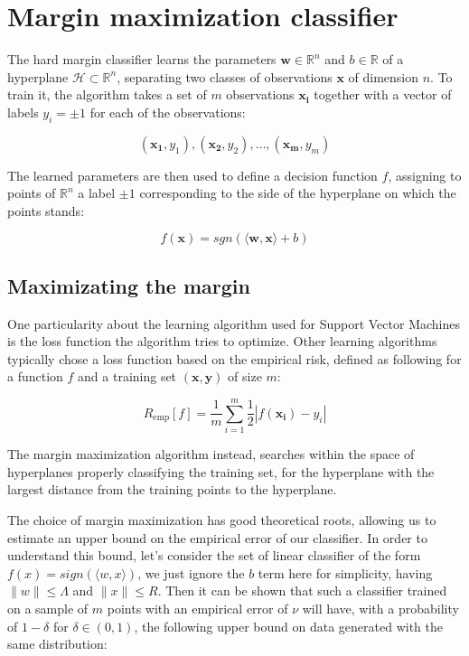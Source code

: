 
\section {Margin maximization classifier}

The hard margin classifier learns the parameters $\mathbf{w} \in \mathbb{R}^n$ and $b \in \mathbb{R}$ of a hyperplane $\mathscr{H} \subset \mathbb{R}^n$, separating two classes of observations $\mathbf{x}$ of dimension $n$. To train it, the algorithm takes a set of $m$ observations $\mathbf{x_i}$ together with a vector of labels $y_i = \pm 1$ for each of the observations:

$$
(\mathbf{x_1}, y_1), (\mathbf{x_2}, y_2), \dotsc, (\mathbf{x_m}, y_m)
$$

The learned parameters are then used to define a decision function $f$, assigning to points of $\mathbb{R}^n$ a label $\pm 1$ corresponding to the side of the hyperplane on which the points stands:

\begin{equation}
  f(\mathbf{x}) = sgn(\langle\mathbf{w}, \mathbf{x}\rangle + b)
\end{equation}

\subsection {Maximizating the margin}

One particularity about the learning algorithm used for Support Vector Machines is the loss function the algorithm tries to optimize. Other learning algorithms typically chose a loss function based on the empirical risk, defined as following for a function $f$ and a training set $(\mathbf{x}, \mathbf{y})$ of size $m$:

\begin{equation}
  R_{\text{emp}}[f] = \frac{1}{m}\sum^m_{i=1}\frac{1}{2}|f(\mathbf{x_i}) - y_i|
\end{equation}

The margin maximization algorithm instead, searches within the space of hyperplanes properly classifying the training set, for the hyperplane with the largest distance from the training points to the hyperplane.

\iffalse
The choice of margin maximization has good theoretical roots, allowing us to estimate an upper bound on the empirical error of our classifier. In order to understand this bound, let's consider the set of linear classifier of the form $f(x) = sign(\langle w, x \rangle)$, we just ignore the $b$ term here for simplicity, having $\|w\| \leq \Lambda$ and $\|x\| \leq R$. Then it can be shown that such a classifier trained on a sample of $m$ points with an empirical error of $\nu$ will have, with a probability of $1 - \delta$ for $\delta \in \left(0, 1\right)$, the following upper bound on data generated with the same distribution:

